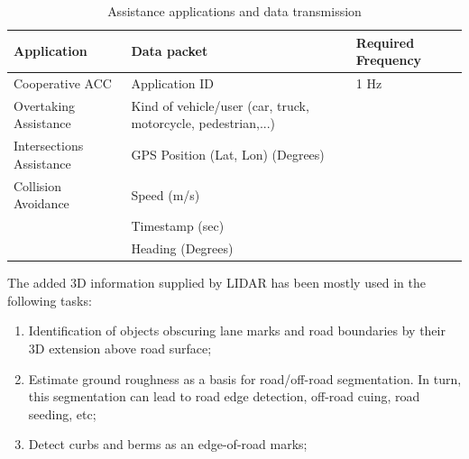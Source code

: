 \documentclass[12pt]{article}
\begin{document}
\begin{table}[h!]
    \begin{center}
        \caption{Assistance applications and data transmission}
        \label{2}
          \begin{tabular}{|p{5cm}|p{5cm}|p{5cm}|}
          \hline
          Application&Data packet&Required Frequency\\
          \hline
          Cooperative ACC&Application ID&1 Hz\\
          \hline
          Overtaking Assistance&Kind of vehicle/user (car, truck, motorcycle, pedestrian,...)&\\
          \hline
          Intersections Assistance&GPS Position (Lat, Lon) (Degrees)&\\
          \hline
          Collision Avoidance&Speed (m/s)&\\
          \hline
          &Timestamp (sec)&\\
          \hline
          &Heading (Degrees)&\\
          \hline
          \end{tabular}
   \end{center}
\end{table}
\newpage
The added 3D information supplied by LIDAR has been mostly used in the following tasks:
\begin{enumerate}
\item Identification of objects obscuring lane marks and road boundaries by their 3D extension above road surface;
\item Estimate ground roughness as a basis for road/off-road segmentation. In turn, this segmentation can lead to road edge detection, off-road cuing, road seeding, etc;
\item Detect curbs and berms as an edge-of-road marks;
\end{enumerate}
\end{document}
